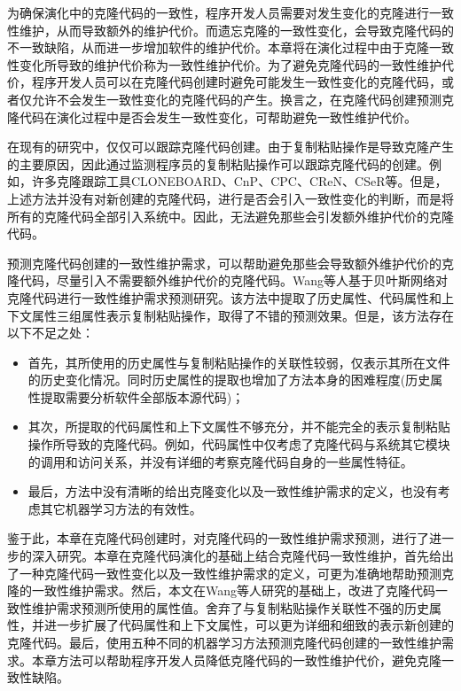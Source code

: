 为确保演化中的克隆代码的一致性，程序开发人员需要对发生变化的克隆进行一致性维护，从而导致额外的维护代价。而遗忘克隆的一致性变化，会导致克隆代码的不一致缺陷，从而进一步增加软件的维护代价\cite{aversano2007clones}\cite{bettenburg2009empirical}。本章将在演化过程中由于克隆一致性变化所导致的维护代价称为一致性维护代价。为了避免克隆代码的一致性维护代价，程序开发人员可以在克隆代码创建时避免可能发生一致性变化的克隆代码，或者仅允许不会发生一致性变化的克隆代码的产生。换言之，在克隆代码创建预测克隆代码在演化过程中是否会发生一致性变化，可帮助避免一致性维护代价。

在现有的研究中，仅仅可以跟踪克隆代码创建。由于复制粘贴操作是导致克隆产生的主要原因，因此通过监测程序员的复制粘贴操作可以跟踪克隆代码的创建。例如，许多克隆跟踪工具CLONEBOARD\cite{de2009managing}、CnP\cite{hou2009cnp}、CPC\cite{weckerle2008cpc}、CReN\cite{jablonski2007cren}、CSeR\cite{jacob2010actively}等。但是，上述方法并没有对新创建的克隆代码，进行是否会引入一致性变化的判断，而是将所有的克隆代码全部引入系统中。因此，无法避免那些会引发额外维护代价的克隆代码。

预测克隆代码创建的一致性维护需求，可以帮助避免那些会导致额外维护代价的克隆代码，尽量引入不需要额外维护代价的克隆代码。Wang等人基于贝叶斯网络对克隆代码进行一致性维护需求预测研究\cite{wang2012can}\cite{wang2014predicting}。该方法中提取了历史属性、代码属性和上下文属性三组属性表示复制粘贴操作，取得了不错的预测效果。但是，该方法存在以下不足之处：

\begin{itemize}
\item
首先，其所使用的历史属性与复制粘贴操作的关联性较弱，仅表示其所在文件的历史变化情况。同时历史属性的提取也增加了方法本身的困难程度(历史属性提取需要分析软件全部版本源代码)；
\item
其次，所提取的代码属性和上下文属性不够充分，并不能完全的表示复制粘贴操作所导致的克隆代码。例如，代码属性中仅考虑了克隆代码与系统其它模块的调用和访问关系，并没有详细的考察克隆代码自身的一些属性特征。
\item
最后，方法中没有清晰的给出克隆变化以及一致性维护需求的定义，也没有考虑其它机器学习方法的有效性。
\end{itemize}

鉴于此，本章在克隆代码创建时，对克隆代码的一致性维护需求预测，进行了进一步的深入研究。本章在克隆代码演化的基础上结合克隆代码一致性维护，首先给出了一种克隆代码一致性变化以及一致性维护需求的定义，可更为准确地帮助预测克隆的一致性维护需求。然后，本文在Wang等人研究的基础上，改进了克隆代码一致性维护需求预测所使用的属性值。舍弃了与复制粘贴操作关联性不强的历史属性，并进一步扩展了代码属性和上下文属性，可以更为详细和细致的表示新创建的克隆代码。最后，使用五种不同的机器学习方法预测克隆代码创建的一致性维护需求。本章方法可以帮助程序开发人员降低克隆代码的一致性维护代价，避免克隆一致性缺陷。

